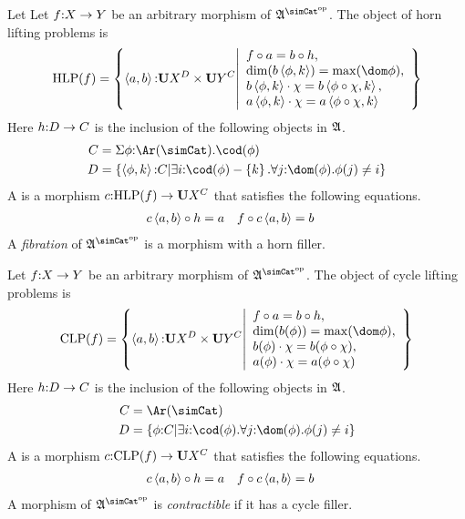 \documentclass[csh.tex]{subfiles}
\begin{document}
\newcommand\HLP{\mathrm{HLP}}
\begin{definition}
Let  Let $f\mathord : X\to Y$ be an arbitrary morphism of $\ambient\s$. The object of horn lifting problems is 
\[\HLP(f) = \set{\tuplet{a,b}\of \base X^D\times \base Y^C \middle|\begin{array}{l}
  f\circ a = b\circ h,\\
  \dim(b\tuplet{\phi,k}) = \max(\dom\phi),\\
  b\tuplet{\phi,k}\cdot\chi = b\tuplet{\phi\circ \chi,k},\\
	a\tuplet{\phi,k}\cdot\chi = a\tuplet{\phi\circ \chi,k}
\end{array}}\]
Here $h\mathord : D\to C$ is the inclusion of the following objects in $\mathfrak A$.
\begin{align*}
C &= \coproduct{\phi\of\Ar(\simCat)}\cod(\phi) \\
D &= \set{\tuplet{\phi,k}\of C \middle| \exists i\of\cod(\phi)-\set k. \forall j\of\dom(\phi).\phi(j)\neq i}
\end{align*}
A  is a morphism $c\of\HLP(f)\to \base X^C$ that satisfies the following equations. 
\begin{align*} c\left\langle a,b \right\rangle\circ h &= a & f\circ c\left\langle a,b \right\rangle &= b \end{align*}
A \emph{fibration} of $\ambient\s$ is a morphism with a horn filler.
\end{definition}

\newcommand\CLP{\mathrm{CLP}}
\begin{definition}
Let $f\mathord : X\to Y$ be an arbitrary morphism of $\ambient\s$. The object of cycle lifting problems is 
\[\CLP(f) = \set{\tuplet{a,b}\of \base X^D\times \base Y^C \middle|\begin{array}{l}
  f\circ a = b\circ h,\\
  \dim(b(\phi)) = \max(\dom\phi),\\
  b(\phi)\cdot\chi = b(\phi\circ \chi),\\
  a(\phi)\cdot\chi = a(\phi\circ \chi)
\end{array}}\]
Here $h\mathord : D\to C$ is the inclusion of the following objects in $\mathfrak A$.
\begin{align*}
C &= \Ar(\simCat) \\
D &= \set{\phi\of C \middle| \exists i\of\cod(\phi).\forall j\of\dom(\phi).\phi(j)\neq i}
\end{align*}
A  is a morphism $c\of\CLP(f)\to \base X^C$ that satisfies the following equations. 
\begin{align*} c\left\langle a,b \right\rangle\circ h &= a & f\circ c\left\langle a,b \right\rangle &= b \end{align*}
A morphism  of $\ambient\s$ is \emph{contractible} if it has a cycle filler.
\end{definition}
\end{document}
